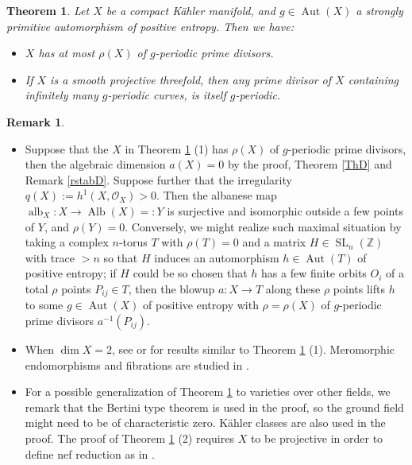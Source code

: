 \documentclass[11pt,a4paper,psamsfonts]{amsart}
\theoremstyle{plain}
\newtheorem{theorem}[thm]{Theorem}
\theoremstyle{definition}
\newtheorem{remark}[thm]{Remark}
\theoremstyle{remark}
\begin{document}
\begin{theorem}\label{ThA}
Let $X$ be a compact K\"ahler manifold, and $g \in {\operatorname{Aut}}(X)$
a strongly primitive automorphism of positive entropy.
Then we have:
\begin{itemize}
\item[(1)]
$X$ has at most $\rho(X)$ of $g$-periodic prime divisors.
\item[(2)]
If $X$ is a smooth projective threefold, then
any prime divisor of $X$ containing infinitely many
$g$-periodic curves, is itself $g$-periodic.
\end{itemize}
\end{theorem}

\begin{remark}\label{rThA}
\begin{itemize}
\item[(1)]
Suppose that the $X$ in Theorem \ref{ThA} (1) has $\rho(X)$ of $g$-periodic prime divisors,
then the algebraic dimension $a(X) = 0$
by the proof, Theorem \ref{ThD} and Remark \ref{rstabD}. Suppose further that
the irregularity
$q(X) := h^1(X, {\mathcal{O}}_X) > 0$. Then the albanese map ${\operatorname{alb}}_X : X \to {\operatorname{Alb}}(X) = : Y$ is surjective and isomorphic
outside a few points of $Y$, and $\rho(Y) = 0$. Conversely,
we might realize such maximal situation by taking a complex $n$-torus $T$
with $\rho(T) = 0$
and a matrix $H \in {\operatorname{SL}}_n({\mathbb{Z}})$ with trace $> n$
so that $H$ induces an automorphism $h \in {\operatorname{Aut}}(T)$ of positive entropy;
if $H$ could be so chosen that $h$ has a few finite orbits $O_i$ of a total $\rho$ points $P_{ij} \in T$,
then the blowup $a: X \to T$ along these $\rho$ points lifts $h$ to some $g \in {\operatorname{Aut}}(X)$
of positive entropy with $\rho = \rho(X)$ of $g$-periodic prime divisors $a^{-1}(P_{ij})$.

\item[(2)]
When $\dim X = 2$, see \cite[Proposition 3.1]{Kawaguchi} or \cite[Theorem 6.2]{Z1} for
results similar to Theorem \ref{ThA} (1). Meromorphic endomorphisms and fibrations are studied in
\cite{AC}.

\item[(3)]
For a possible generalization of Theorem \ref{ThA}
to varieties over other fields,
we remark that the Bertini type theorem is
used in the proof, so the ground field might need to be
of characteristic zero.
K\"ahler classes are also used in the proof.
The proof of Theorem \ref{ThA} (2) requires
$X$ to be projective in order to define nef reduction as in \cite{8aut}.
\end{itemize}
\end{remark}
\end{document}
